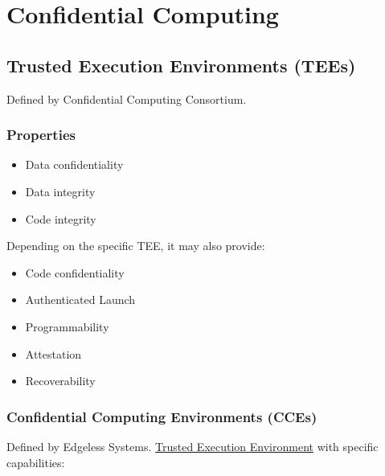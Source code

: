 

\chapter{Confidential Computing}

\section{Trusted Execution Environments (TEEs)}
\label{sec:TEE}

Defined by Confidential Computing Consortium.

\subsection{Properties}

\begin{itemize}
  \item Data confidentiality
  \item Data integrity
  \item Code integrity
\end{itemize}

Depending on the specific TEE, it may also provide:

\begin{itemize}
  \item Code confidentiality
  \item Authenticated Launch
  \item Programmability
  \item Attestation
  \item Recoverability
\end{itemize}

\subsection{Confidential Computing Environments (CCEs)}

Defined by Edgeless Systems. \hyperref[sec:TEE]{Trusted Execution Environment}
with specific capabilities:


